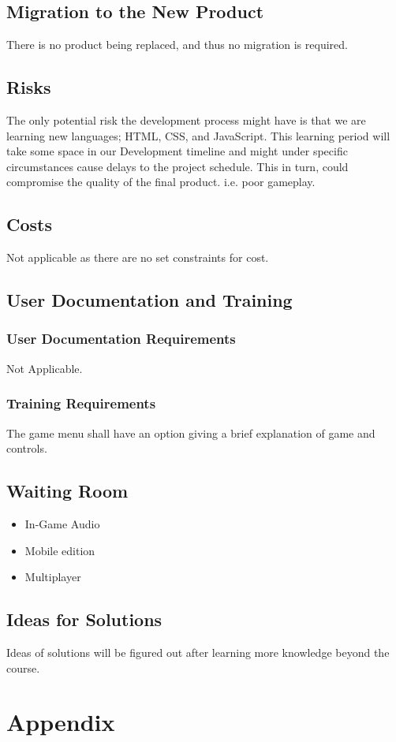 \documentclass[12pt, titlepage]{article}
\begin{document}
\subsection{Migration to the New Product}
There is no product being replaced, and thus no migration is required.
\subsection{Risks}
The only potential risk the development process might have is that we are
learning new languages; HTML, CSS, and JavaScript. This learning period will
take some space in our Development timeline and might under specific
circumstances cause delays to the project schedule. This in turn, could
compromise the quality of the final product. i.e. poor gameplay.
\subsection{Costs}
Not applicable as there are no set constraints for cost.
\subsection{User Documentation and Training}
\subsubsection{User Documentation Requirements}
Not Applicable.
\subsubsection{Training Requirements}
The game menu shall have an option giving a brief explanation of game and 
controls. 
\subsection{Waiting Room}
\begin{itemize}
\item In-Game Audio
\item Mobile edition
\item Multiplayer
\end{itemize}
\subsection{Ideas for Solutions}
Ideas of solutions will be figured out after learning more knowledge beyond the course.

\newpage
\section{Appendix}
\end{document}
